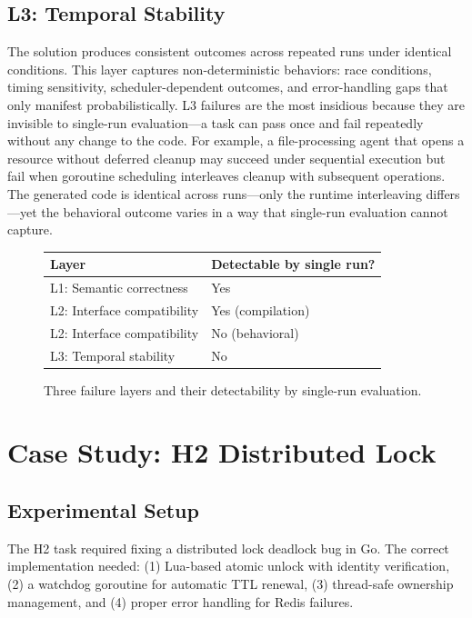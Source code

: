 \documentclass[conference]{IEEEtran}
\begin{document}
\subsection{L3: Temporal Stability}

The solution produces consistent outcomes across repeated runs under identical conditions.
This layer captures non-deterministic behaviors: race conditions, timing sensitivity, scheduler-dependent outcomes, and error-handling gaps that only manifest probabilistically.
L3 failures are the most insidious because they are invisible to single-run evaluation---a task can pass once and fail repeatedly without any change to the code.
For example, a file-processing agent that opens a resource without deferred cleanup may succeed under sequential execution but fail when goroutine scheduling interleaves cleanup with subsequent operations. The generated code is identical across runs---only the runtime interleaving differs---yet the behavioral outcome varies in a way that single-run evaluation cannot capture.

\begin{figure}[h]
\centering
\begin{tabular}{p{}p{}}
\toprule
\textbf{Layer} & \textbf{Detectable by single run?} \\
\midrule
L1: Semantic correctness & Yes \\
L2: Interface compatibility & Yes (compilation) \\
L2: Interface compatibility & No (behavioral) \\
L3: Temporal stability & No \\
\bottomrule
\end{tabular}
\caption{Three failure layers and their detectability by single-run evaluation.}
\label{tab:layers}
\end{figure}

\section{Case Study: H2 Distributed Lock}

\subsection{Experimental Setup}

The H2 task required fixing a distributed lock deadlock bug in Go.
The correct implementation needed: (1) Lua-based atomic unlock with identity verification, (2) a watchdog goroutine for automatic TTL renewal, (3) thread-safe ownership management, and (4) proper error handling for Redis failures.
\end{document}
